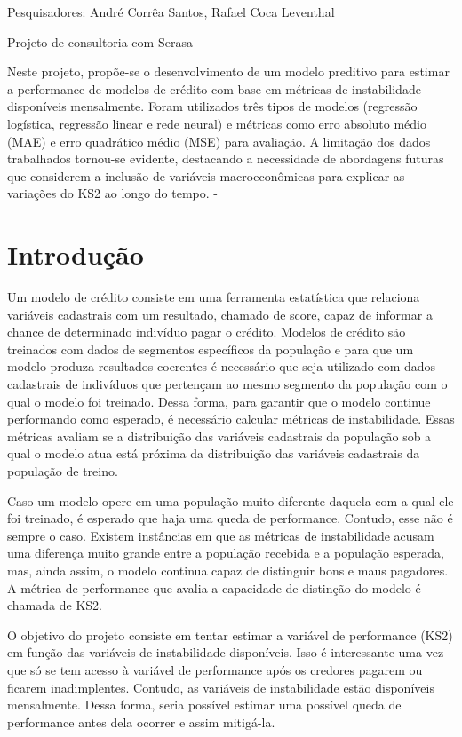     {
        \noindent Pesquisadores: André Corrêa Santos, Rafael Coca Leventhal

        \noindent Projeto de consultoria com Serasa
    }
    {Neste projeto, propõe-se o desenvolvimento de um modelo preditivo para estimar a performance de modelos de crédito com base em métricas de instabilidade disponíveis mensalmente. Foram utilizados três tipos de modelos (regressão logística, regressão linear e rede neural) e métricas como erro absoluto médio (MAE) e erro quadrático médio (MSE) para avaliação. A limitação dos dados trabalhados tornou-se evidente, destacando a necessidade de abordagens futuras que considerem a inclusão de variáveis macroeconômicas para explicar as variações do KS2 ao longo do tempo.}
    {-}

\section{Introdução}
Um modelo de crédito consiste em uma ferramenta estatística que relaciona variáveis cadastrais com um resultado, chamado de score, capaz de informar a chance de determinado indivíduo pagar o crédito.
Modelos de crédito são treinados com dados de segmentos específicos da população e para que um modelo produza resultados coerentes é necessário que seja utilizado com dados cadastrais de indivíduos que pertençam ao mesmo segmento da população com o qual o modelo foi treinado. Dessa forma, para garantir que o modelo continue performando como esperado, é necessário calcular métricas de instabilidade. Essas métricas avaliam se a distribuição das variáveis cadastrais da população sob a qual o modelo atua está próxima da distribuição das variáveis cadastrais da população de treino.

Caso um modelo opere em uma população muito diferente daquela com a qual ele foi treinado, é esperado que haja uma queda de performance. Contudo, esse não é sempre o caso. Existem instâncias em que as métricas de instabilidade acusam uma diferença muito grande entre a população recebida e a população esperada, mas, ainda assim, o modelo continua capaz de distinguir bons e maus pagadores. A métrica de performance que avalia a capacidade de distinção do modelo é chamada de KS2.

O objetivo do projeto consiste em tentar estimar a variável de performance (KS2) em função das variáveis de instabilidade disponíveis. Isso é interessante uma vez que só se tem acesso à variável de performance após os credores pagarem ou ficarem inadimplentes. Contudo, as variáveis de instabilidade estão disponíveis mensalmente. Dessa forma, seria possível estimar uma possível queda de performance antes dela ocorrer e assim mitigá-la.

